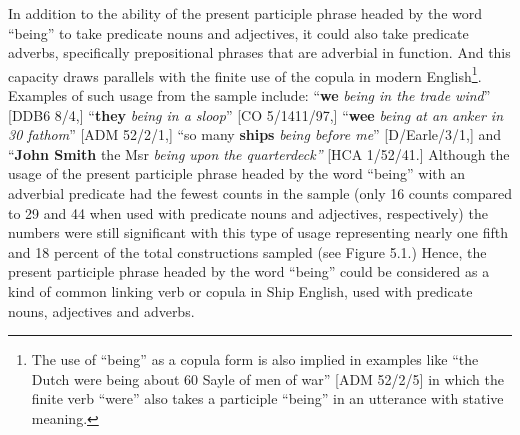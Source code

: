 \begin{styleStandard}
In addition to the ability of the present participle phrase headed by the word “being” to take predicate nouns and adjectives, it could also take predicate adverbs, specifically prepositional phrases that are adverbial in function. And this capacity draws parallels with the finite use of the copula in modern English\footnote{ The use of “being” as a copula form is also implied in examples like “the Dutch were being about 60 Sayle of men of war” [ADM 52/2/5] in which the finite verb “were” also takes a participle “being” in an utterance with stative meaning. }. Examples of such usage from the sample include: “\textbf{we} \textit{being in the trade wind}” [DDB6 8/4,] “\textbf{they} \textit{being in a sloop}” [CO 5/1411/97,] “\textbf{wee }\textit{being at an anker in 30 fathom}” [ADM 52/2/1,] “so many \textbf{ships }\textit{being before me}” [D/Earle/3/1,] and “\textbf{John Smith} the Msr \textit{being upon the quarterdeck” }[HCA 1/52/41.] Although the usage of the present participle phrase headed by the word “being” with an adverbial predicate had the fewest counts in the sample (only 16 counts compared to 29 and 44 when used with predicate nouns and adjectives, respectively) the numbers were still significant with this type of usage representing nearly one fifth and 18 percent of the total constructions sampled (see Figure 5.1.) Hence, the present participle phrase headed by the word “being” could be considered as a kind of common linking verb or copula in Ship English, used with predicate nouns, adjectives and adverbs. 
\end{styleStandard}

